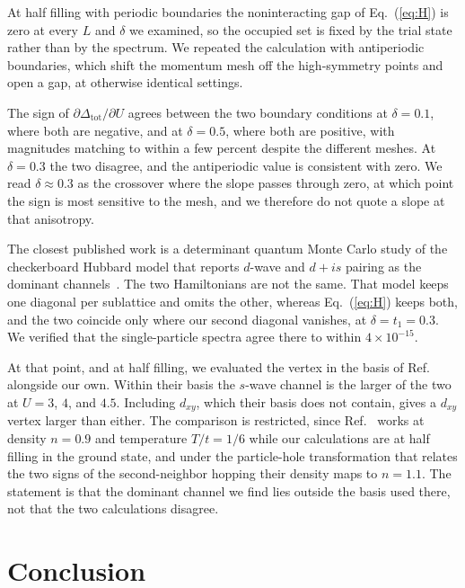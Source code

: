 \documentclass[aps,prl,reprint,superscriptaddress,amsmath,amssymb,floatfix]{revtex4-2}
\begin{document}
At half filling with periodic boundaries the noninteracting gap of
Eq.~(\ref{eq:H}) is zero at every $L$ and $\delta$ we examined, so the occupied
set is fixed by the trial state rather than by the spectrum. We repeated the
calculation with antiperiodic boundaries, which shift the momentum mesh off the
high-symmetry points and open a gap, at otherwise identical settings.

The sign of $\partial \Delta_{\mathrm{tot}} / \partial U$ agrees between the two
boundary conditions at $\delta = 0.1$, where both are negative, and at
$\delta = 0.5$, where both are positive, with magnitudes matching to within a
few percent despite the different meshes. At $\delta = 0.3$ the two disagree,
and the antiperiodic value is consistent with zero. We read $\delta \approx 0.3$
as the crossover where the slope passes through zero, at which point the sign is
most sensitive to the mesh, and we therefore do not quote a slope at that
anisotropy.

The closest published work is a determinant quantum Monte Carlo study of the
checkerboard Hubbard model that reports $d$-wave and $d + is$ pairing as the
dominant channels~\cite{Pan2024}. The two Hamiltonians are not the same. That
model keeps one diagonal per sublattice and omits the other, whereas
Eq.~(\ref{eq:H}) keeps both, and the two coincide only where our second diagonal
vanishes, at $\delta = t_1 = 0.3$. We verified that the single-particle spectra
agree there to within $4\times10^{-15}$.

At that point, and at half filling, we evaluated the vertex in the basis of
Ref.~\cite{Pan2024} alongside our own. Within their basis the $s$-wave channel
is the larger of the two at $U = 3$, $4$, and $4.5$. Including $d_{xy}$, which
their basis does not contain, gives a $d_{xy}$ vertex larger than either.
The comparison is restricted, since Ref.~\cite{Pan2024} works at density
$n = 0.9$ and temperature $T/t = 1/6$ while our calculations are at half filling
in the ground state, and under the particle-hole transformation that relates the
two signs of the second-neighbor hopping their density maps to $n = 1.1$. The
statement is that the dominant channel we find lies outside the basis used
there, not that the two calculations disagree.

\section{Conclusion}
\end{document}
